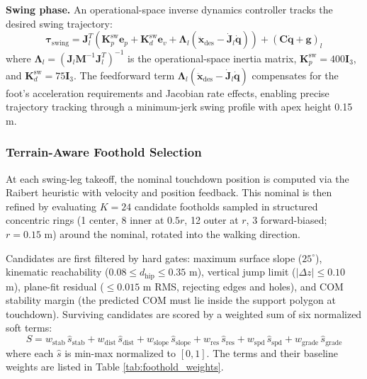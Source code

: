 \documentclass[letterpaper, 10 pt, conference]{ieeeconf}  %
\begin{document}
\textbf{Swing phase.} An operational-space inverse dynamics controller tracks the desired swing trajectory:
\begin{equation}
\boldsymbol{\tau}_{\text{swing}} = \mathbf{J}_l^T \left(\mathbf{K}_p^{\text{sw}} \mathbf{e}_p + \mathbf{K}_d^{\text{sw}} \mathbf{e}_v + \boldsymbol{\Lambda}_l(\ddot{\mathbf{x}}_{\text{des}} - \dot{\mathbf{J}}_l \dot{\mathbf{q}})\right) + \left(\mathbf{C}\dot{\mathbf{q}} + \mathbf{g}\right)_l \label{eq:swing_tau}
\end{equation}
where $\boldsymbol{\Lambda}_l = (\mathbf{J}_l \mathbf{M}^{-1} \mathbf{J}_l^T)^{-1}$ is the operational-space inertia matrix, $\mathbf{K}_p^{\text{sw}} = 400\mathbf{I}_3$,  and $\mathbf{K}_d^{\text{sw}} = 75\mathbf{I}_3$. The feedforward term $\boldsymbol{\Lambda}_l(\ddot{\mathbf{x}}_{\text{des}} - \dot{\mathbf{J}}_l\dot{\mathbf{q}})$ compensates for the foot's acceleration requirements and Jacobian rate effects, enabling precise trajectory tracking through a minimum-jerk swing profile with apex height 0.15 m.

\subsubsection{Terrain-Aware Foothold Selection}
\label{sec:foothold_sel}
At each swing-leg takeoff, the nominal touchdown position is computed via the Raibert heuristic with velocity and position feedback. This nominal is then refined by evaluating $K = 24$ candidate footholds sampled in structured concentric rings (1 center, 8 inner at $0.5r$, 12 outer at $r$, 3 forward-biased; $r = 0.15$ m) around the nominal, rotated into the walking direction.

Candidates are first filtered by hard gates: maximum surface slope ($25^\circ$), kinematic reachability ($0.08 \leq d_{\text{hip}} \leq 0.35$ m), vertical jump limit ($|\Delta z| \leq 0.10$ m), plane-fit residual ($\leq 0.015$ m RMS, rejecting edges and holes), and COM stability margin (the predicted COM must lie inside the support polygon at touchdown). Surviving candidates are scored by a weighted sum of six normalized soft terms:
\begin{equation}
S = w_{\text{stab}}\, \hat{s}_{\text{stab}} + w_{\text{dist}}\, \hat{s}_{\text{dist}} + w_{\text{slope}}\, \hat{s}_{\text{slope}} + w_{\text{res}}\, \hat{s}_{\text{res}} + w_{\text{spd}}\, \hat{s}_{\text{spd}} + w_{\text{grade}}\, \hat{s}_{\text{grade}} \label{eq:foothold_score}
\end{equation}
where each $\hat{s}$ is min-max normalized to $[0,1]$. The terms and their baseline weights are listed in Table \ref{tab:foothold_weights}.
\end{document}
